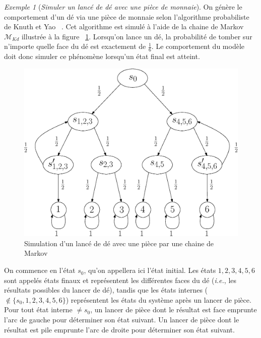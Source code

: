 \documentclass[12pt,a4paper]{report}
\theoremstyle{definition}%
\theoremstyle{remark}
\newtheorem{example}{Exemple}[chapter]
\newcommand{\ie}{\textit{i.e.}, }
\begin{document}
\begin{example} [\textit{Simuler un lancé de dé avec une pièce de monnaie}] \label{knuthdie}
	On génère le comportement d'un dé via une pièce de monnaie selon l'algorithme probabiliste de Knuth et Yao ~\cite{KY76}. Cet algorithme est simulé à l'aide de la chaine de Markov $\mathcal{M}_{Kd}$ illustrée à la figure ~\ref{diebyacoin}. Lorsqu'on lance un dé, la probabilité de tomber sur n'importe quelle face du dé est exactement de $\frac{1}{6}$. Le comportement du modèle doit donc simuler ce phénomène lorsqu'un état final est atteint.
	\begin{figure}[H]
		\centering
		\includegraphics[scale=0.5]{figures/dieByaCoin.eps}
		\caption{Simulation d'un lancé de dé avec une pièce par une chaine de Markov}
		\label{diebyacoin}
	\end{figure}
	On commence en l'état $s_0$, qu'on appellera ici l'état initial. Les états $1, 2, 3, 4, 5, 6$ sont appelés états finaux et représentent les différentes faces du dé (\ie les résultats possibles du lancer de dé), tandis que les états internes ($\notin \{s_0, 1, 2, 3, 4, 5, 6\}$) représentent les états du système après un lancer de pièce. Pour tout état interne $\neq s_0$, un lancer de pièce dont le résultat est face emprunte l'arc de gauche pour déterminer son état suivant. Un lancer de pièce dont le résultat est pile emprunte l'arc de droite pour déterminer son état suivant.\\
	

\end{example}
\end{document}
